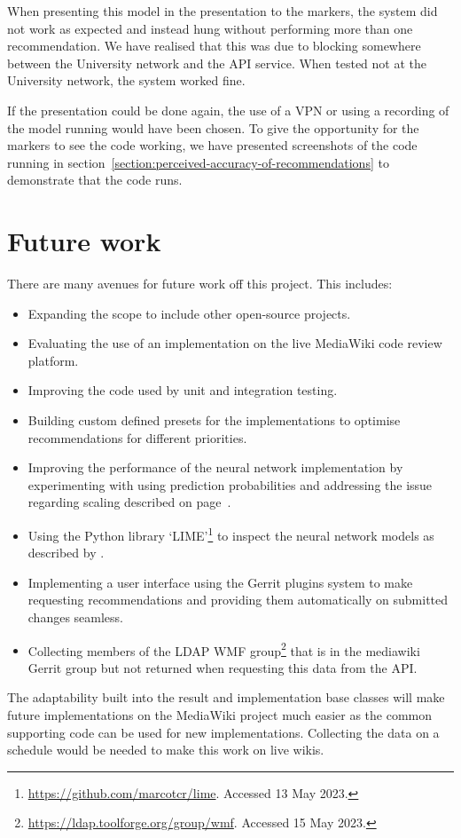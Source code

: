 When presenting this model in the presentation to the markers, the system did not work as expected and instead hung without performing more than one recommendation. We have realised that this was due to blocking somewhere between the University network and the API service. When tested not at the University network, the system worked fine.

If the presentation could be done again, the use of a VPN or using a recording of the model running would have been chosen. To give the opportunity for the markers to see the code working, we have presented screenshots of the code running in section~\ref{section:perceived-accuracy-of-recommendations} to demonstrate that the code runs.

\section{Future work\label{section:future-work}}
There are many avenues for future work off this project. This includes:
\begin{itemize}
    \item Expanding the scope to include other open-source projects.
    \item Evaluating the use of an implementation on the live MediaWiki code review platform.
    \item Improving the code used by unit and integration testing.
    \item Building custom defined presets for the implementations to optimise recommendations for different priorities.
    \item Improving the performance of the neural network implementation by experimenting with using prediction probabilities and addressing the issue regarding scaling described on page~\pageref{para:training-when-scaling-caused-issues}.
    \item Using the Python library `LIME'\footnote{\url{https://github.com/marcotcr/lime}. Accessed 13 May 2023.} to inspect the neural network models as described by \cite{10.1145/2939672.2939778}.
    \item Implementing a user interface using the Gerrit plugins system to make requesting recommendations and providing them automatically on submitted changes seamless.
    \item Collecting members of the LDAP WMF group\footnote{\url{https://ldap.toolforge.org/group/wmf}. Accessed 15 May 2023.} that is in the mediawiki Gerrit group but not returned when requesting this data from the API.
\end{itemize}

The adaptability built into the result and implementation base classes will make future implementations on the MediaWiki project much easier as the common supporting code can be used for new implementations. Collecting the data on a schedule would be needed to make this work on live wikis.